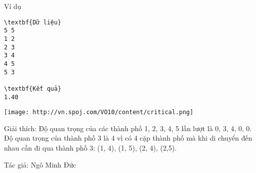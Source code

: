 Ví dụ
\begin{verbatim}
\textbf{Dữ liệu}
5 5
1 2
2 3
3 4
4 5
5 3

\textbf{Kết quả}
1.40

\end{verbatim}


\texttt{[image: http://vn.spoj.com/VO10/content/critical.png]}

Giải thích: Độ quan trọng của các thành phố 1, 2, 3, 4, 5 lần lượt là 0, 3, 4, 0, 0. Độ quan trọng của thành phố 3 là 4 vì có 4 cặp thành phố mà khi di chuyển đến nhau cần đi qua thành phố 3: (1, 4), (1, 5), (2, 4), (2,5).

Tác giả: Ngô Minh Đức